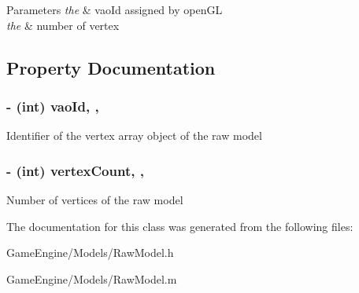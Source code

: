 \begin{DoxyParams}{Parameters}
{\em the} & vao\+Id assigned by open\+GL \\
\hline
{\em the} & number of vertex \\
\hline
\end{DoxyParams}


\subsection{Property Documentation}
\subsubsection[{\texorpdfstring{vao\+Id}{vaoId}}]{\setlength{\rightskip}{0pt plus 5cm}-\/ (int) vao\+Id\hspace{0.3cm}{\ttfamily [read]}, {\ttfamily [atomic]}, {\ttfamily [assign]}}\hypertarget{interface_raw_model_a136659c909db791eabf42a7f63449337}{}\label{interface_raw_model_a136659c909db791eabf42a7f63449337}
Identifier of the vertex array object of the raw model 
\subsubsection[{\texorpdfstring{vertex\+Count}{vertexCount}}]{\setlength{\rightskip}{0pt plus 5cm}-\/ (int) vertex\+Count\hspace{0.3cm}{\ttfamily [read]}, {\ttfamily [atomic]}, {\ttfamily [assign]}}\hypertarget{interface_raw_model_adc187504bcabe21832acfb0df3103711}{}\label{interface_raw_model_adc187504bcabe21832acfb0df3103711}
Number of vertices of the raw model 

The documentation for this class was generated from the following files\+:\begin{DoxyCompactItemize}
\item 
Game\+Engine/\+Models/Raw\+Model.\+h\item 
Game\+Engine/\+Models/Raw\+Model.\+m\end{DoxyCompactItemize}
